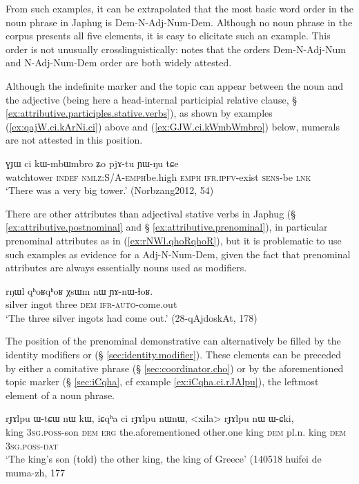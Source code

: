 From such examples, it can be extrapolated that the most basic word order in the noun phrase in Japhug is Dem-N-Adj-Num-Dem. Although no noun phrase in the corpus presents all five elements, it is easy to elicitate such an example. This order is not unusually crosslinguistically: \citet{cinque05universal20} notes that the orders  Dem-N-Adj-Num and N-Adj-Num-Dem order are both widely attested.

Although the indefinite marker  and the topic  can appear between the noun and the adjective (being here a head-internal participial relative clause, § \ref{ex:attributive.participles.stative.verbs}), as shown by examples (\ref{ex:qajW.ci.kArNi.ci}) above and (\ref{ex:GJW.ci.kWmbWmbro}) below, numerals are not attested in this position.

\begin{exe}
\ex \label{ex:GJW.ci.kWmbWmbro}
 \gll ɣɟɯ ci kɯ-mbɯ\redp{}mbro ʑo pjɤ-tu ɲɯ-ŋu tɕe   \\
 watchtower \textsc{indef} \textsc{nmlz}:S/A-\textsc{emph}\redp{}be.high \textsc{emph} \textsc{ifr}.\textsc{ipfv}-exist \textsc{sens}-be \textsc{lnk} \\
\glt  `There was a very big tower.' (Norbzang2012, 54)
\end{exe}

There are other attributes than adjectival stative verbs in Japhug (§ \ref{ex:attributive.postnominal} and § \ref{ex:attributive.prenominal}), in particular prenominal attributes as  in (\ref{ex:rNWl.qhoRqhoR}), but it is problematic to use such examples as evidence for a Adj-N-Num-Dem, given the fact that prenominal attributes are always essentially nouns used as modifiers.

 \begin{exe}
\ex \label{ex:rNWl.qhoRqhoR}
\gll  rŋɯl qʰoʁqʰoʁ χsɯm nɯ ɲɤ-nɯ-ɬoʁ. \\
silver ingot three \textsc{dem} \textsc{ifr}-\textsc{auto}-come.out \\
\glt `The three silver ingots had come out.' (28-qAjdoskAt, 178)
\end{exe}

The position of the prenominal demonstrative can alternatively be filled by the identity modifiers  or  (§ \ref{sec:identity.modifier}). These elements can be preceded by either a comitative  phrase (§ \ref{sec:coordinator.cho}) or by the aforementioned topic marker  (§ \ref{sec:iCqha}, cf example \ref{ex:iCqha.ci.rJAlpu}), the leftmost element of a noun phrase.

 \begin{exe}
\ex \label{ex:iCqha.ci.rJAlpu}
\gll rɟɤlpu ɯ-tɕɯ nɯ kɯ, iɕqʰa ci rɟɤlpu nɯnɯ, <xila> rɟɤlpu nɯ ɯ-ɕki, \\
king \textsc{3sg}.\textsc{poss}-son \textsc{dem} \textsc{erg} the.aforementioned other.one king \textsc{dem} pl.n. king \textsc{dem} \textsc{3sg}.\textsc{poss}-\textsc{dat} \\
\glt `The king's son (told) the other king, the king of Greece' (140518 huifei de muma-zh, 177
\end{exe}


